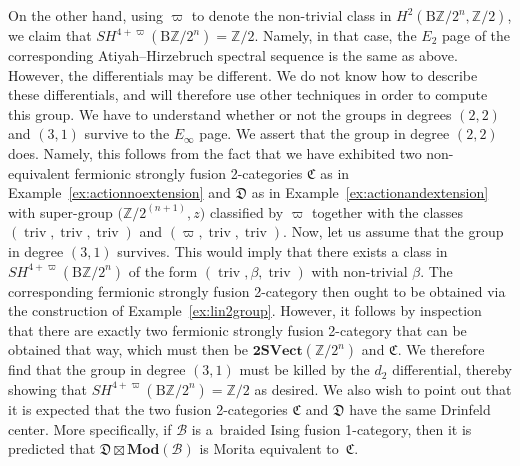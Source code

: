 \documentclass[pdftex]{sigma}
\numberwithin{equation}{section}
\begin{document}
\begin{Example}
On the other hand, using $\varpi$ to denote the non-trivial class in $H^2(\mathrm{B}\mathbb{Z}/2^{n},\mathbb{Z}/2)$, we claim that $SH^{4+\varpi}(\mathrm{B}\mathbb{Z}/2^{n})=\mathbb{Z}/2$. Namely, in that case, the $E_2$ page of the corresponding Atiyah--Hirzebruch spectral sequence is the same as above. However, the differentials  may be different. We do not know how to describe these differentials, and will therefore use other techniques in order to compute this group. We have to understand whether or not the groups in degrees $(2,2)$ and $(3,1)$ survive to the $E_{\infty}$ page. We assert that the group in degree $(2,2)$ does. Namely, this follows from the fact that we have exhibited two non-equivalent fermionic strongly fusion 2-categories $\mathfrak{C}$ as in Example~\ref{ex:actionnoextension} and $\mathfrak{D}$ as in Example~\ref{ex:actionandextension} with super-group $\bigl(\mathbb{Z}/2^{(n+1)},z\bigr)$ classified by $\varpi$ together with the classes $(\operatorname{triv},\operatorname{triv},\operatorname{triv})$ and $(\varpi,\operatorname{triv},\operatorname{triv})$. Now, let us assume that the group in degree $(3,1)$ survives. This would imply that there exists a class in $SH^{4+\varpi}(\mathrm{B}\mathbb{Z}/2^{n})$ of the form $(\operatorname{triv},\beta,\operatorname{triv})$ with non-trivial $\beta$. The corresponding fermionic strongly fusion 2-category then ought to be obtained via the construction of Example~\ref{ex:lin2group}. However, it follows by inspection that there are exactly two fermionic strongly fusion 2-category that can be obtained that way, which must then be $\mathbf{2SVect}(\mathbb{Z}/2^n)$ and $\mathfrak{C}$. We therefore find that the group in degree $(3,1)$ must be killed by the $d_2$ differential, thereby showing that $SH^{4+\varpi}(\mathrm{B}\mathbb{Z}/2^{n})=\mathbb{Z}/2$ as desired. We also wish to point out that it is expected that the two fusion 2-categories $\mathfrak{C}$ and $\mathfrak{D}$ have the same Drinfeld center. More specifically, if $\mathcal{B}$ is a~braided Ising fusion 1-category, then it is predicted that $\mathfrak{D}\boxtimes\mathbf{Mod}(\mathcal{B})$ is Morita equivalent to~$\mathfrak{C}$.
\end{Example}
\end{document}
